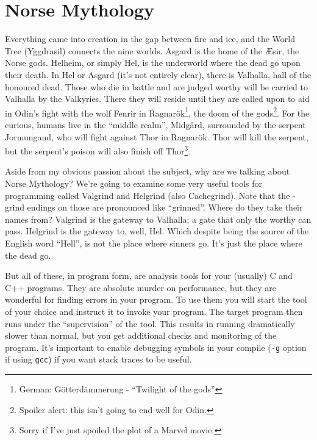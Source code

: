 




\section*{Norse Mythology}
Everything came into creation in the gap between fire and ice, and the World Tree (Yggdrasil) connects the nine worlds. Asgard is the home of the \AE sir, the Norse gods. Helheim, or simply Hel, is the underworld where the dead go upon their death. In Hel or Asgard (it's not entirely clear), there is Valhalla, hall of the honoured dead. Those who die in battle and are judged worthy will be carried to Valhalla by the Valkyries. There they will reside until they are called upon to aid in Odin's fight with the wolf Fenrir in Ragnar\"ok\footnote{German: G\"otterd\"ammerung - ``Twilight of the gods''}, the doom of the gods\footnote{Spoiler alert: this isn't going to end well for Odin.}. For the curious, humans live in the ``middle realm'', Midg\aa rd, surrounded by the serpent Jormungand, who will fight against Thor in  Ragnar\"ok. Thor will kill the serpent, but the serpent's poison will also finish off Thor\footnote{Sorry if I've just spoiled the plot of a Marvel movie.}.

Aside from my obvious passion about the subject, why are we talking about Norse Mythology? We're going to examine some very useful tools for programming called Valgrind and Helgrind (also Cachegrind). Note that the -grind endings on those are pronounced like ``grinned''. Where do they take their names from? Valgrind is the gateway to Valhalla; a gate that only the worthy can pass. Helgrind is the gateway to, well, Hel. Which despite being the source of the English word ``Hell'', is not the place where sinners go. It's just the place where the dead go.

But all of these, in program form, are analysis tools for your (usually) C and C++ programs. They are absolute murder on performance, but they are wonderful for finding errors in your program. To use them you will start the tool of your choice and instruct it to invoke your program. The target program then runs under the ``supervision'' of the tool. This results in running dramatically slower than normal, but you get additional checks and monitoring of the program. It's important to enable debugging symbols in your compile (\texttt{-g} option if using \texttt{gcc}) if you want stack traces to be useful.


